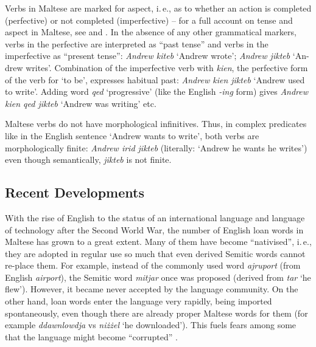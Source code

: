 \documentclass[]{../../metanetpaper}
\begin{document}
\begin{multicols}{2}

Verbs in Maltese are marked for aspect, i.\,e., as to whether an action is completed (perfective) or not completed (imperfective) -- for a full account on tense and aspect in Maltese, see \cite{Fabri:1995} and \cite{Ebert:2000}. In the absence of any other grammatical markers, verbs in the perfective are interpreted as ``past tense'' and verbs in the imperfective as ``present tense'': \emph{Andrew kiteb} `Andrew wrote'; \emph{Andrew jikteb} `An-drew writes'. Combination of the imperfective verb with \emph{kien}, the perfective form of the verb for `to be', expresses habitual past: \emph{Andrew kien jikteb} `Andrew used to write'. Adding word \emph{qed} `progressive' (like the English \emph{-ing} form) gives \emph{Andrew kien qed jikteb} `Andrew was writing' etc.

Maltese verbs do not have morphological infinitives. Thus, in complex predicates like in the English sentence `Andrew wants to write', both verbs are morphologically finite: \emph{Andrew irid jikteb} (literally: `Andrew he wants he writes') even though semantically, \emph{jikteb} is not finite.  

\subsection{Recent Developments}

With the rise of English to the status of an international language and language of technology after the Second World War, the number of English loan words in Maltese has grown to a great extent. Many of them have become ``nativised'', i.\,e., they are adopted in regular use so much that even derived Semitic words cannot re-place them. For example, instead of the commonly used word \emph{ajruport} (from English \emph{airport}), the Semitic word \emph{mitjar} once was proposed (derived from \emph{tar} `he flew'). However, it became never accepted by the language community. On the other hand, loan words enter the language very rapidly, being imported spontaneously, even though there are already proper Maltese words for them (for example \emph{ddawnlowdja} vs \emph{niżżel} `he downloaded'). This fuels fears among some that the language might become ``corrupted'' \cite{Fabri:2011a}.


\end{multicols}
\end{document}
